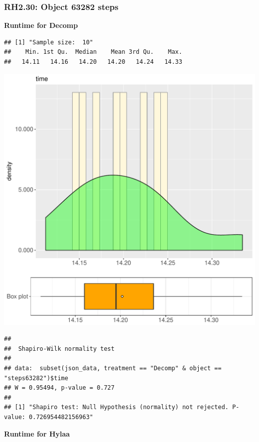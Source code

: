 \documentclass{article}\usepackage[]{graphicx}\usepackage[]{color}
\makeatletter
\def\maxwidth{ %
  \ifdim\Gin@nat@width>\linewidth
    \linewidth
  \else
    \Gin@nat@width
  \fi
}
\newenvironment{kframe}{%
 \def\at@end@of@kframe{}%
 \ifinner\ifhmode%
  \def\at@end@of@kframe{\end{minipage}}%
  \begin{minipage}{\columnwidth}%
 \fi\fi%
 \def\FrameCommand##1{\hskip\@totalleftmargin \hskip-\fboxsep
 \colorbox{shadecolor}{##1}\hskip-\fboxsep
     \hskip-\linewidth \hskip-\@totalleftmargin \hskip\columnwidth}%
 \MakeFramed {\advance\hsize-\width
   \@totalleftmargin\z@ \linewidth\hsize
   \@setminipage}}%
 {\par\unskip\endMakeFramed%
 \at@end@of@kframe}
\newenvironment{knitrout}{}{} %
\makeatother
\begin{document}
\subsubsection{RH2.30: Object 63282 steps}

 \textbf{Runtime for Decomp}
\begin{knitrout}
\color{fgcolor}\begin{kframe}
\begin{verbatim}
## [1] "Sample size:  10"
##    Min. 1st Qu.  Median    Mean 3rd Qu.    Max. 
##   14.11   14.16   14.20   14.20   14.24   14.33
\end{verbatim}
\end{kframe}
\includegraphics[width=\maxwidth]{figure/RH2_Decomp_steps63282-1} 
\begin{kframe}\begin{verbatim}
## 
## 	Shapiro-Wilk normality test
## 
## data:  subset(json_data, treatment == "Decomp" & object == "steps63282")$time
## W = 0.95494, p-value = 0.727
## 
## [1] "Shapiro test: Null Hypothesis (normality) not rejected. P-value: 0.726954482156963"
\end{verbatim}
\end{kframe}
\end{knitrout}
 \textbf{Runtime for Hylaa}
\end{document}
